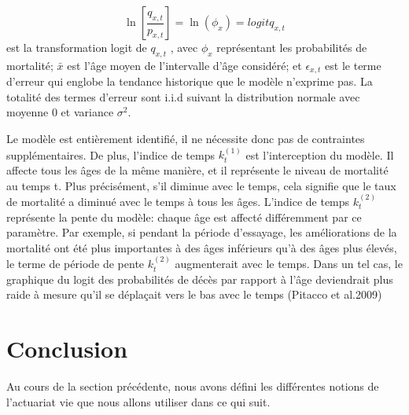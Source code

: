 \begin{equation}
\ln[\frac{q_{x,t}}{p_{x,t}}] = \ln(\phi_x) = logit q_{x,t}
\end{equation} est la transformation logit de $q_{x,t}$
, avec $\phi_x$ représentant les probabilités de mortalité;
$\bar{x}$ est l'âge moyen de l'intervalle d'âge considéré; et
$\epsilon_{x,t}$ est le terme d'erreur qui englobe la tendance historique que le modèle n'exprime pas. La totalité des termes d'erreur sont i.i.d suivant la distribution normale avec moyenne 0 et variance $\sigma^2$.

Le modèle est entièrement identifié, il ne nécessite donc pas de contraintes supplémentaires.
De plus, l'indice de temps $k_t^{(1)}$ est l'interception du modèle. Il affecte tous les âges de la même manière, et il représente le niveau de mortalité au temps t. Plus précisément, s'il diminue avec le temps, cela signifie que le taux de mortalité a diminué avec le temps à tous les âges. L'indice de temps $k_t^{(2)}$ représente la pente du modèle: chaque âge est affecté différemment par ce paramètre. Par exemple, si pendant la période d'essayage,
les améliorations de la mortalité ont été plus importantes à des âges inférieurs qu'à des âges plus élevés, le terme de période de pente
$k_t^{(2)}$ augmenterait avec le temps. Dans un tel cas, le graphique du logit des probabilités de décès par rapport à l'âge deviendrait plus raide à mesure qu'il se déplaçait vers le bas avec le temps (Pitacco et al.2009)


\section*{Conclusion}
Au cours de la section précédente, nous avons défini les différentes notions de l'actuariat vie que nous allons utiliser dans ce qui suit.